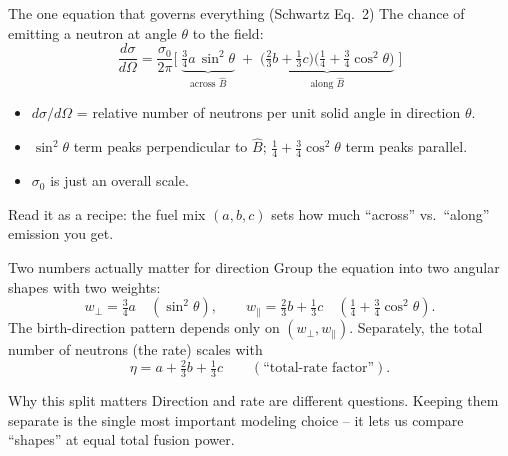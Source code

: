 \documentclass[aspectratio=169]{beamer}
\newcommand{\Bhat}{\hat{B}}
\begin{document}
\begin{frame}{The one equation that governs everything (Schwartz Eq.~2)}
  The chance of emitting a neutron at angle $\theta$ to the field:
  \[
    \frac{d\sigma}{d\Omega}=\frac{\sigma_0}{2\pi}\Big[\;
      \underbrace{\tfrac34 a\,\sin^2\theta}_{\text{across }\Bhat}
      \;+\;\underbrace{\big(\tfrac23 b+\tfrac13 c\big)\big(\tfrac14+\tfrac34\cos^2\theta\big)}_{\text{along }\Bhat}\;\Big]
  \]
  \begin{itemize}
    \item $d\sigma/d\Omega$ = relative number of neutrons per unit solid angle in direction $\theta$.
    \item $\sin^2\theta$ term peaks \alert{perpendicular} to $\Bhat$; $\tfrac14+\tfrac34\cos^2\theta$ term peaks \alert{parallel}.
    \item $\sigma_0$ is just an overall scale.
  \end{itemize}
  \vfill
  \alert{Read it as a recipe:} the fuel mix $(a,b,c)$ sets how much ``across'' vs.\ ``along'' emission you get.
\end{frame}

\begin{frame}{Two numbers actually matter for direction}
  Group the equation into two \alert{angular shapes} with two weights:
  \[
    w_\perp = \tfrac34 a \quad(\sin^2\theta),\qquad
    w_\parallel = \tfrac23 b + \tfrac13 c \quad(\tfrac14+\tfrac34\cos^2\theta).
  \]
  The birth-direction pattern depends \alert{only} on $(w_\perp,w_\parallel)$.
  \vfill
  Separately, the \alert{total number} of neutrons (the rate) scales with
  \[
    \eta = a + \tfrac23 b + \tfrac13 c \qquad(\text{``total-rate factor''}).
  \]
  \begin{block}{Why this split matters}
    \alert{Direction and rate are different questions.} Keeping them separate is the single most important modeling choice -- it lets us compare ``shapes'' at \alert{equal total fusion power}.
  \end{block}
\end{frame}
\end{document}
